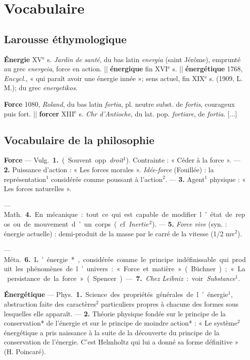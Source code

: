 \chapter{Vocabulaire}

\section{Larousse éthymologique}
{\bf Énergie }{\footnotesize XV}$^\text{e}$ s. {\it Jardin de santé}, du bas latin {\it energia} (saint Jérôme), emprunté au grec {\it energeia}, force en action. || {\bf énergique} fin {\footnotesize XVI}$^\text{e}$ s. || {\bf énergétique} 1768, {\it Encycl.}, « qui paraît avoir une énergie innée »; sens actuel, fin {\footnotesize XIX}$^\text{e}$ s. (1909, L. M.); du grec {\it energetikos}.

{\bf Force} 1080, {\it Roland}, du bas latin {\it fortia}, pl. neutre subst. de {\it fortis}, courageux puis fort. || {\bf forcer} {\footnotesize XIII}$^\text{e}$ s. {\it Chr d'Antioche}, du lat. pop. {\it fortiare}, de {\it fortia}. [...]%


\section{Vocabulaire de la philosophie}
{\bf Force} — \si{Vulg.} {\bf 1.} (Souvent opp. {\it droit}$^1$). Contrainte :
« Céder à la force ». — {\bf 2.} Puissance d'action : « Les forces morales ».
{\it Idée-force} (Fouillée) : la représentation$^1$ considérée comme poussant
à l’action$^2$. — {\bf 3.} Agent$^1$ physique : « Les forces naturelles ».

— \si{Math.} {\bf 4.} En mécanique : tout ce qui est capable de modifier l’état de
repos ou de mouvement d’un corps (cf. {\it Inertie}$^{\,2}$). — {\bf 5.}
{\it Force vive} (syn. : énergie actuelle) : demi-produit de la masse par le
carré de la vitesse (1/2 mv$^2$).

— \si{Méta.} {\bf 6.} L’énergie*, considérée comme le principe indéfinissable
qui produit les phénomènes de l’univers : « Force et matière » (Büchner) ;
« La persistance de la force » (Spencer). — {\bf 7.} {\it Chez Leibniz} :
voir {\it Substance}$^1$.

{\bf Énergétique} — \si{Phys.} {\bf 1.} Science des
propriétés générales de l’énergie$^1$,
abstraction faite des caractères$^2$
particuliers propres à chacune des
formes sous lesquelles elle apparaît.
— {\bf 2.} Théorie physique fondée sur
le principe de la conservation* de
l'énergie et sur le principe de moindre
action* : « Le système$^2$ énergétique
a pris naissance à la suite de la
découverte du principe
de la conservation de l'énergie. C’est
Helmholtz qui lui a donné sa forme
définitive » (H. Poincaré).


